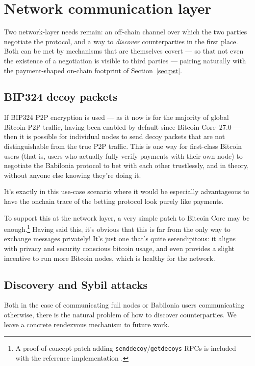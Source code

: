\documentclass[11pt]{article}
\begin{document}
\section{Network communication layer}
\label{sec:netlayer}

Two network-layer needs remain: an off-chain channel over which the two parties negotiate the protocol, and a way to \emph{discover} counterparties in the first place. Both can be met by mechanisms that are themselves covert --- so that not even the existence of a negotiation is visible to third parties --- pairing naturally with the payment-shaped on-chain footprint of Section~\ref{sec:pst}.

\subsection{BIP324 decoy packets}

If BIP324 \cite{bip324} P2P encryption is used --- as it now is for the majority of global Bitcoin P2P traffic, having been enabled by default since Bitcoin Core~27.0 \cite{optechv2} --- then it is possible for individual nodes to send decoy packets that are not distinguishable from the true P2P traffic. This is one way for first-class Bitcoin users (that is, users who actually fully verify payments with their own node) to negotiate the Babilonia protocol to bet with each other trustlessly, and in theory, without anyone else knowing they're doing it.

It's exactly in this use-case scenario where it would be especially advantageous to have the onchain trace of the betting protocol look purely like payments.

To support this at the network layer, a very simple patch to Bitcoin Core may be enough.\footnote{A proof-of-concept patch adding \texttt{senddecoy}/\texttt{getdecoys} RPCs is included with the reference implementation \cite{babilonia}.} Having said this, it's obvious that this is far from the only way to exchange messages privately! It's just one that's quite serendipitous: it aligns with privacy and security conscious bitcoin usage, and even provides a slight incentive to run more Bitcoin nodes, which is healthy for the network.

\subsection{Discovery and Sybil attacks}

Both in the case of communicating full nodes or Babilonia users communicating otherwise, there is the natural problem of how to discover counterparties. We leave a concrete rendezvous mechanism to future work.
\end{document}
